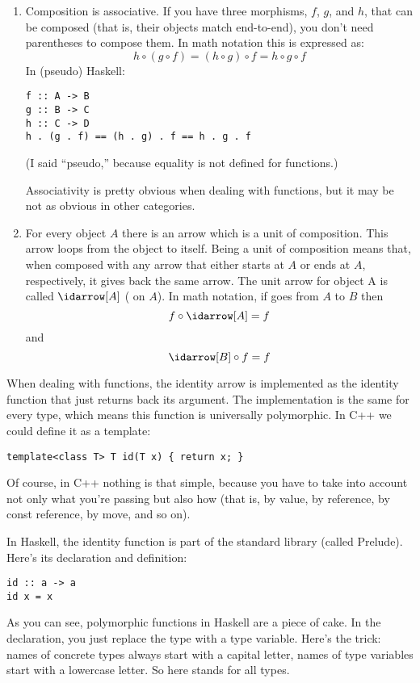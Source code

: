 \begin{enumerate}
\item
Composition is associative. If you have three morphisms, $f$, $g$, and $h$,
that can be composed (that is, their objects match end-to-end), you
don't need parentheses to compose them. In math notation this is
expressed as:
\[h \circ (g \circ f) = (h \circ g) \circ f = h \circ g \circ f\]
In (pseudo) Haskell:

\begin{Verbatim}
f :: A -> B
g :: B -> C
h :: C -> D
h . (g . f) == (h . g) . f == h . g . f
\end{Verbatim}
(I said ``pseudo,'' because equality is not defined for functions.)

Associativity is pretty obvious when dealing with functions, but it may
be not as obvious in other categories.

\item
For every object $A$ there is an arrow which is a unit of composition.
This arrow loops from the object to itself. Being a unit of composition
means that, when composed with any arrow that either starts at $A$ or ends
at $A$, respectively, it gives back the same arrow. The unit arrow for
object A is called $\idarrow[A]$ ( on $A$). In math
notation, if  goes from $A$ to $B$ then
\[f \circ \idarrow[A] = f\]
and
\[\idarrow[B] \circ f = f\]
\end{enumerate}
When dealing with functions, the identity arrow is implemented as the
identity function that just returns back its argument. The
implementation is the same for every type, which means this function is
universally polymorphic. In C++ we could define it as a template:

\begin{Verbatim}
template<class T> T id(T x) { return x; }
\end{Verbatim}
Of course, in C++ nothing is that simple, because you have to take into
account not only what you're passing but also how (that is, by value, by
reference, by const reference, by move, and so on).

In Haskell, the identity function is part of the standard library
(called Prelude). Here's its declaration and definition:

\begin{Verbatim}
id :: a -> a
id x = x
\end{Verbatim}
As you can see, polymorphic functions in Haskell are a piece of cake. In
the declaration, you just replace the type with a type variable. Here's
the trick: names of concrete types always start with a capital letter,
names of type variables start with a lowercase letter. So here
 stands for all types.

